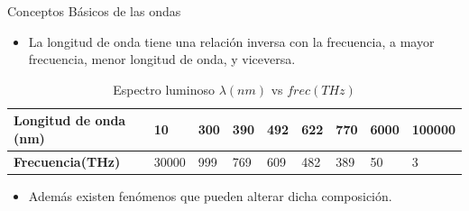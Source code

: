 \documentclass[aspectratio=169]{beamer}
\begin{document}
\begin{frame}{Conceptos Básicos de las ondas}
\begin{itemize}
    \item La longitud de onda tiene una relación inversa con la frecuencia, a mayor frecuencia, menor longitud de onda, y viceversa.
\end{itemize}
 \begin{table}[]
 \footnotesize
    \centering
    \begin{tabular}{m{3.2cm} m{0.8cm} m{0.8cm} m{0.8cm} m{0.8cm} m{0.8cm} m{0.8cm} m{0.8cm} m{0.8cm} }
        \toprule
        \textbf{Longitud de onda (nm)} & 10 & 300 & 390 & 492 & 622 & 770 & 6000 & 100000\\
        \midrule
        \textbf{Frecuencia(THz)} & 30000 & 999 & 769 & 609 & 482 & 389 & 50 & 3  \\

        \bottomrule
    \end{tabular}
    \tiny{\caption{Espectro luminoso $\lambda (nm)$ vs $frec (THz)$} \cite{sole2005instrumentacion}}
    \label{Longitud vs Frecuencia}
    \normalsize
    \begin{itemize}
    \item Además existen fenómenos que pueden alterar dicha composición.
\end{itemize}
\end{table}
    
\end{frame}
\end{document}
